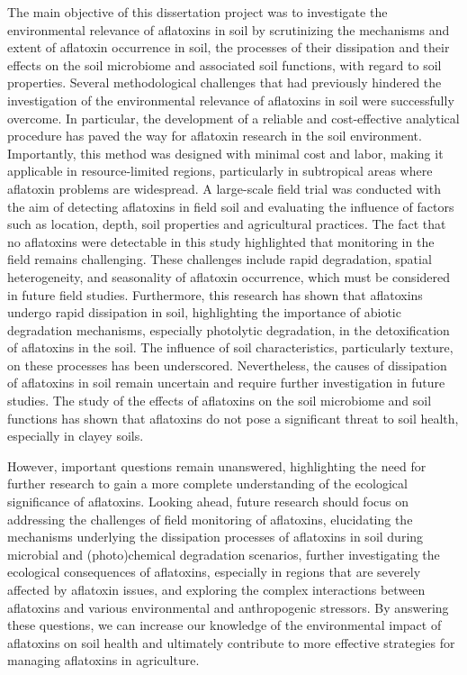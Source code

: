 The main objective of this dissertation project was to investigate the environmental relevance of aflatoxins in soil by scrutinizing the mechanisms and extent of aflatoxin occurrence in soil, the processes of their dissipation and their effects on the soil microbiome and associated soil functions, with regard to soil properties. Several methodological challenges that had previously hindered the investigation of the environmental relevance of aflatoxins in soil were successfully overcome. In particular, the development of a reliable and cost-effective analytical procedure has paved the way for aflatoxin research in the soil environment. Importantly, this method was designed with minimal cost and labor, making it applicable in resource-limited regions, particularly in subtropical areas where aflatoxin problems are widespread. A large-scale field trial was conducted with the aim of detecting aflatoxins in field soil and evaluating the influence of factors such as location, depth, soil properties and agricultural practices. The fact that no aflatoxins were detectable in this study highlighted that monitoring in the field remains challenging. These challenges include rapid degradation, spatial heterogeneity, and seasonality of aflatoxin occurrence, which must be considered in future field studies. Furthermore, this research has shown that aflatoxins undergo rapid dissipation in soil, highlighting the importance of abiotic degradation mechanisms, especially photolytic degradation, in the detoxification of aflatoxins in the soil. The influence of soil characteristics, particularly texture, on these processes has been underscored. Nevertheless, the causes of dissipation of aflatoxins in soil remain uncertain and require further investigation in future studies. The study of the effects of aflatoxins on the soil microbiome and soil functions has shown that aflatoxins do not pose a significant threat to soil health, especially in clayey soils. 


However, important questions remain unanswered, highlighting the need for further research to gain a more complete understanding of the ecological significance of aflatoxins. Looking ahead, future research should focus on addressing the challenges of field monitoring of aflatoxins, elucidating the mechanisms underlying the dissipation processes of aflatoxins in soil during microbial and (photo)chemical degradation scenarios, further investigating the ecological consequences of aflatoxins, especially in regions that are severely affected by aflatoxin issues, and exploring the complex interactions between aflatoxins and various environmental and anthropogenic stressors. By answering these questions, we can increase our knowledge of the environmental impact of aflatoxins on soil health and ultimately contribute to more effective strategies for managing aflatoxins in agriculture.
